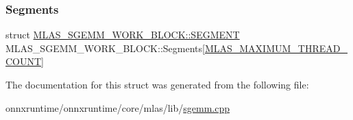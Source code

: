 \subsubsection{\texorpdfstring{Segments}{Segments}}
{\footnotesize\ttfamily struct \mbox{\hyperlink{structMLAS__SGEMM__WORK__BLOCK_1_1SEGMENT}{M\+L\+A\+S\+\_\+\+S\+G\+E\+M\+M\+\_\+\+W\+O\+R\+K\+\_\+\+B\+L\+O\+C\+K\+::\+S\+E\+G\+M\+E\+NT}}  M\+L\+A\+S\+\_\+\+S\+G\+E\+M\+M\+\_\+\+W\+O\+R\+K\+\_\+\+B\+L\+O\+C\+K\+::\+Segments\mbox{[}\mbox{\hyperlink{mlasi_8h_a86466d6811df85b69801ae746e3ad493}{M\+L\+A\+S\+\_\+\+M\+A\+X\+I\+M\+U\+M\+\_\+\+T\+H\+R\+E\+A\+D\+\_\+\+C\+O\+U\+NT}}\mbox{]}}



The documentation for this struct was generated from the following file\+:\begin{DoxyCompactItemize}
\item 
onnxruntime/onnxruntime/core/mlas/lib/\mbox{\hyperlink{sgemm_8cpp}{sgemm.\+cpp}}\end{DoxyCompactItemize}
